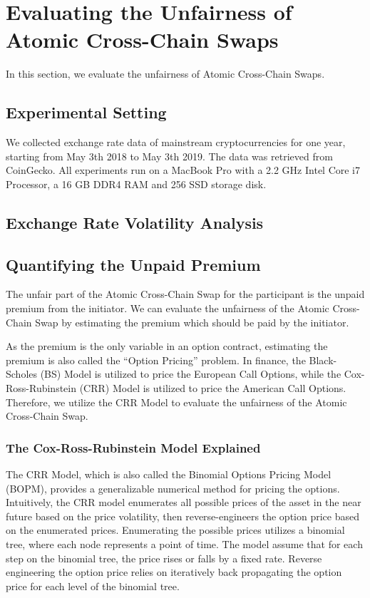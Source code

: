 \section{Evaluating the Unfairness of Atomic Cross-Chain Swaps}
\label{sec:evaluation}

In this section, we evaluate the unfairness of Atomic Cross-Chain Swaps.

\subsection{Experimental Setting}

We collected exchange rate data of mainstream cryptocurrencies for one year, starting from May 3th 2018 to May 3th 2019.
The data was retrieved from CoinGecko.
All experiments run on a MacBook Pro with a 2.2 GHz Intel Core i7 Processor, a 16 GB DDR4 RAM and 256 SSD storage disk.

\subsection{Exchange Rate Volatility Analysis}



\subsection{Quantifying the Unpaid Premium}

The unfair part of the Atomic Cross-Chain Swap for the participant is the unpaid premium from the initiator.
We can evaluate the unfairness of the Atomic Cross-Chain Swap by estimating the premium which should be paid by the initiator.

As the premium is the only variable in an option contract, estimating the premium is also called the ``Option Pricing'' problem.
In finance, the Black-Scholes (BS) Model is utilized to price the European Call Options,
while the Cox-Ross-Rubinstein (CRR) Model is utilized to price the American Call Options.
Therefore, we utilize the CRR Model to evaluate the unfairness of the Atomic Cross-Chain Swap.

\subsubsection{The Cox-Ross-Rubinstein Model Explained}

The CRR Model, which is also called the Binomial Options Pricing Model (BOPM), provides a generalizable numerical method for pricing the options.
Intuitively, the CRR model enumerates all possible prices of the asset in the near future based on the price volatility,
then reverse-engineers the option price based on the enumerated prices.
Enumerating the possible prices utilizes a binomial tree, where each node represents a point of time.
The model assume that for each step on the binomial tree, the price rises or falls by a fixed rate.
Reverse engineering the option price relies on iteratively back propagating the option price for each level of the binomial tree.

